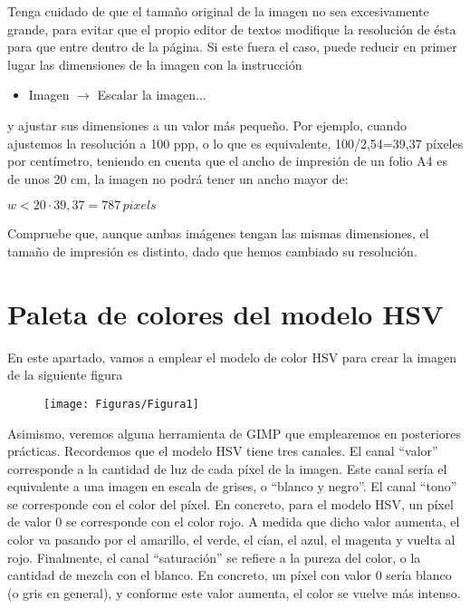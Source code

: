 \documentclass[es,practica]{uah}
\begin{document}
Tenga cuidado de que el tamaño original de la imagen no sea excesivamente grande, para evitar que el propio editor de textos modifique la resolución de ésta para que entre dentro de la página. Si este fuera el caso, puede reducir en primer lugar las dimensiones de la imagen con la instrucción
\begin{itemize}
	\item Imagen $\rightarrow$ Escalar la imagen...
\end{itemize}

y ajustar sus dimensiones a un valor más pequeño. Por ejemplo, cuando ajustemos la resolución a 100 ppp, o lo que es equivalente, 100/2,54=39,37 píxeles por centímetro, teniendo en cuenta que el ancho de impresión de un folio A4 es de unos 20 cm, la imagen no podrá tener un ancho mayor de:

$w<20\cdot 39,37=787 \, pixels$

Compruebe que, aunque ambas imágenes tengan las mismas dimensiones, el tamaño de impresión es distinto, dado que hemos cambiado su resolución.



\section{Paleta de colores del modelo HSV}

En este apartado, vamos a emplear el modelo de color HSV para crear la
imagen de la siguiente figura

\begin{figure}[h!]
  \centering
  \texttt{[image: Figuras/Figura1]}
\end{figure}

Asimismo, veremos alguna herramienta de GIMP que emplearemos en posteriores prácticas. Recordemos que el modelo HSV tiene tres canales. El canal ``valor'' corresponde a la cantidad de luz de cada píxel de la imagen. Este canal sería el equivalente a una imagen en escala de grises, o ``blanco y negro''. El canal ``tono'' se corresponde con el color del píxel. En concreto, para el modelo HSV, un píxel de valor 0 se corresponde con el color rojo. A medida que dicho valor aumenta, el color va pasando por el amarillo, el verde, el cían, el azul, el magenta y vuelta al rojo. Finalmente, el canal ``saturación'' se refiere a la pureza del color, o la cantidad de mezcla con el blanco. En concreto, un píxel con valor 0 sería blanco (o gris en general), y conforme este valor aumenta, el color se vuelve más intenso.
\end{document}
